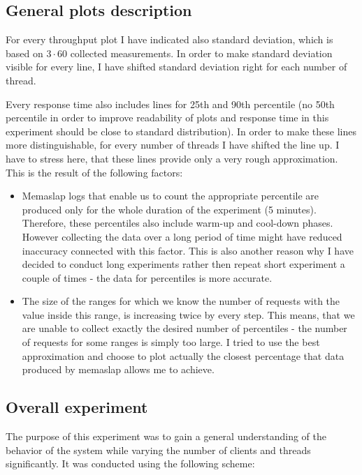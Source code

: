 \documentclass[11pt]{article}
\begin{document}
\subsection{General plots description}
\label{sec:max-throughput-plots}

For every throughput plot I have indicated also standard deviation, which is based on $3\cdot60$ collected measurements. In order to make standard deviation visible for every line, I have shifted standard deviation right for each number of thread.

Every response time also includes lines for 25th and 90th percentile (no 50th percentile in order to improve readability of plots and response time in this experiment should be close to standard distribution). In order to make these lines more distinguishable, for every number of threads I have shifted the line up. I have to stress here, that these lines provide only a very rough approximation. This is the result of the following factors:
\begin{itemize}
\item Memaslap logs that enable us to count the appropriate percentile are produced only for the whole duration of the experiment (5 minutes). Therefore, these percentiles also include warm-up and cool-down phases. However collecting the data over a long period of time might have reduced inaccuracy connected with this factor. This is also another reason why I have decided to conduct long experiments rather then repeat short experiment a couple of times - the data for percentiles is more accurate.
\item The size of the ranges for which we know the number of requests with the value inside this range, is increasing twice by every step. This means, that we are unable to collect exactly the desired number of percentiles - the number of requests for some ranges is simply too large. I tried to use the best approximation and choose to plot actually the closest percentage that data produced by memaslap allows me to achieve.
\end{itemize}

\subsection{Overall experiment}
The purpose of this experiment was to gain a general understanding of the behavior of the system while varying the number of clients and threads significantly. It was conducted using the following scheme:
\medskip
\end{document}
